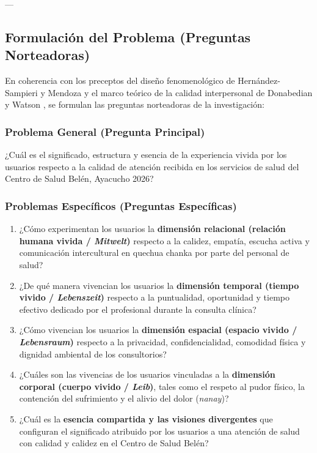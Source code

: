 ---

\subsection{Formulación del Problema (Preguntas Norteadoras)}
\label{sec:1.2_formulacion_problema}

En coherencia con los preceptos del diseño fenomenológico de Hernández-Sampieri y Mendoza \cite{sampieri2018} y el marco teórico de la calidad interpersonal de Donabedian \cite{donabedian2005} y Watson \cite{watson2008}, se formulan las preguntas norteadoras de la investigación:

\subsubsection{Problema General (Pregunta Principal)}
\label{sec:1.2.1_preg_gral}
¿Cuál es el significado, estructura y esencia de la experiencia vivida por los usuarios respecto a la calidad de atención recibida en los servicios de salud del Centro de Salud Belén, Ayacucho 2026?

\subsubsection{Problemas Específicos (Preguntas Específicas)}
\label{sec:1.2.2_preg_esp}
\begin{enumerate}
    \item ¿Cómo experimentan los usuarios la \textbf{dimensión relacional (relación humana vivida / \textit{Mitwelt})} respecto a la calidez, empatía, escucha activa y comunicación intercultural en quechua chanka por parte del personal de salud?
    \item ¿De qué manera vivencian los usuarios la \textbf{dimensión temporal (tiempo vivido / \textit{Lebenszeit})} respecto a la puntualidad, oportunidad y tiempo efectivo dedicado por el profesional durante la consulta clínica?
    \item ¿Cómo vivencian los usuarios la \textbf{dimensión espacial (espacio vivido / \textit{Lebensraum})} respecto a la privacidad, confidencialidad, comodidad física y dignidad ambiental de los consultorios?
    \item ¿Cuáles son las vivencias de los usuarios vinculadas a la \textbf{dimensión corporal (cuerpo vivido / \textit{Leib})}, tales como el respeto al pudor físico, la contención del sufrimiento y el alivio del dolor (\textit{nanay})?
    \item ¿Cuál es la \textbf{esencia compartida y las visiones divergentes} que configuran el significado atribuido por los usuarios a una atención de salud con calidad y calidez en el Centro de Salud Belén?
\end{enumerate}

